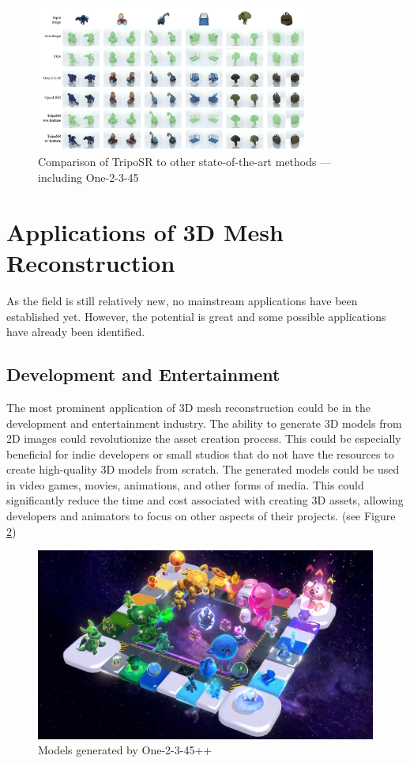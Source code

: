 \begin{figure}
    \centering
    \includegraphics[width=0.8\textwidth]{images/comparison_tripo.jpg}
    \caption{Comparison of TripoSR to other state-of-the-art methods — including One-2-3-45 \autocite{tochilkin_triposr_2024}}
    \label{fig:comparison-tripo}
\end{figure}

\section{Applications of 3D Mesh Reconstruction}
As the field is still relatively new, no mainstream applications have been established yet. However, the potential is great and some possible applications have already been identified.

\subsection{Development and Entertainment}
The most prominent application of 3D mesh reconstruction could be in the development and entertainment industry. The ability to generate 3D models from 2D images could revolutionize the asset creation process.
This could be especially beneficial for indie developers or small studios that do not have the resources to create high-quality 3D models from scratch. The generated models could be used in video games, movies, animations, and other forms of media. This could significantly reduce the time and cost associated with creating 3D assets, allowing developers and animators to focus on other aspects of their projects. (see Figure \ref{fig:one-2-3-4-5-plus-plus-demo})
\begin{figure}
    \centering
    \includegraphics[width=1\linewidth]{images/one-2-3-45++_demo.jpg}
    \caption{Models generated by One-2-3-45++ \autocite{liu_one-2-3-45_2024}}
    \label{fig:one-2-3-4-5-plus-plus-demo}
\end{figure}

